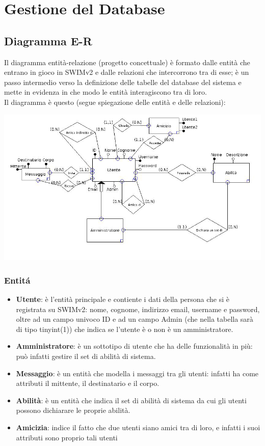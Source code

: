 \section{Gestione del Database}

\subsection{Diagramma E-R}
Il diagramma entità-relazione (progetto concettuale) è formato dalle entità che entrano in gioco in SWIMv2 e dalle relazioni che intercorrono tra di esse; è un passo intermedio
verso la definizione delle tabelle del database del sistema e mette in evidenza in che modo le entità interagiscono tra di loro.
\\[2\baselineskip]
\noindent
Il diagramma è questo (segue spiegazione delle entità e delle relazioni):
\vspace{1cm}
\begin{center}
 \includegraphics[width=1.1\columnwidth]{ER.png}
\end{center}

\subsubsection{Entit\'a}
\begin{itemize}
 \item {\bfseries Utente}: è l'entità principale e contiente i dati della persona che si è registrata su SWIMv2: nome, cognome, indirizzo email, username e password, oltre ad un campo
 univoco ID e ad un campo Admin (che nella tabella sarà di tipo tinyint(1)) che indica se l'utente è o non è un amministratore.
 \item {\bfseries Amministratore}: è un sottotipo di utente che ha delle funzionalità in più: può infatti gestire il set di abilità di sistema.
 \item {\bfseries Messaggio}: è un entità che modella i messaggi tra gli utenti: infatti ha come attributi il mittente, il destinatario e il corpo.
 \item {\bfseries Abilità}: è un entità che indica il set di abilità di sistema da cui gli utenti possono dichiarare le proprie abilità.
 \item {\bfseries Amicizia}: indice il fatto che due utenti siano amici tra di loro, e infatti i suoi attributi sono proprio tali utenti
\end{itemize}

